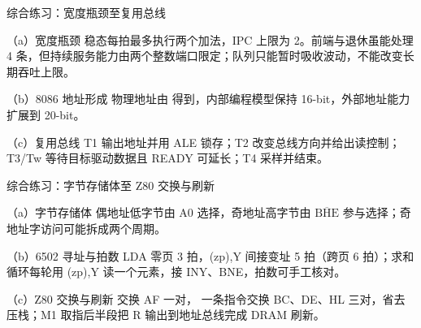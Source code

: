 \begin{chapteranswer}{综合练习：宽度瓶颈至复用总线}
\begin{answersubproblem}{（a）宽度瓶颈}
稳态每拍最多执行两个加法，IPC 上限为 2。前端与退休虽能处理 4 条，但持续服务能力由两个整数端口限定；队列只能暂时吸收波动，不能改变长期吞吐上限。
\end{answersubproblem}
\begin{answersubproblem}{（b）8086 地址形成}
物理地址由  得到，内部编程模型保持 16-bit，外部地址能力扩展到 20-bit。
\end{answersubproblem}
\begin{answersubproblem}{（c）复用总线}
T1 输出地址并用 ALE 锁存；T2 改变总线方向并给出读控制；T3/Tw 等待目标驱动数据且 READY 可延长；T4 采样并结束。
\end{answersubproblem}
\end{chapteranswer}

\begin{chapteranswer}{综合练习：字节存储体至 Z80 交换与刷新}
\begin{answersubproblem}{（a）字节存储体}
偶地址低字节由 A0 选择，奇地址高字节由 \(\overline{\mathrm{BHE}}\) 参与选择；奇地址字访问可能拆成两个周期。
\end{answersubproblem}
\begin{answersubproblem}{（b）6502 寻址与拍数}
LDA 零页 3 拍，(zp),Y 间接变址 5 拍（跨页 6 拍）；求和循环每轮用 (zp),Y 读一个元素，接 INY、BNE，拍数可手工核对。
\end{answersubproblem}
\begin{answersubproblem}{（c）Z80 交换与刷新}
 交换 AF 一对， 一条指令交换 BC、DE、HL 三对，省去压栈；M1 取指后半段把 R 输出到地址总线完成 DRAM 刷新。
\end{answersubproblem}
\end{chapteranswer}


